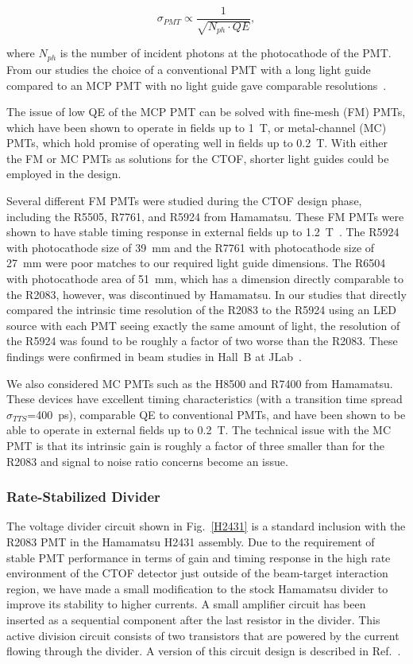 \documentclass{elsart}
\begin{document}
\begin{equation}
\sigma_{PMT} \propto \frac{1}{\sqrt{N_{ph} \cdot QE}},
\end{equation}

\noindent
where $N_{ph}$ is the number of incident photons at the photocathode of the PMT. From our studies
the choice of a conventional PMT with a long light guide compared to an MCP PMT with no light guide
gave comparable resolutions~\cite{baturin06}.

The issue of low QE of the MCP PMT can be solved with fine-mesh (FM) PMTs, which have been
shown to operate in fields up to 1~T, or metal-channel (MC) PMTs, which hold promise of
operating well in fields up to 0.2~T. With either the FM or MC PMTs as solutions for the CTOF,
shorter light guides could be employed in the design.

Several different FM PMTs were studied during the CTOF design phase, including the R5505,
R7761, and R5924 from Hamamatsu. These FM PMTs were shown to have stable timing response
in external fields up to 1.2~T~\cite{bonesini}. The R5924 with photocathode size of 39~mm
and the R7761 with photocathode size of 27~mm were poor matches to our required light guide
dimensions. The R6504 with photocathode area of 51~mm, which has a dimension directly comparable
to the R2083, however, was discontinued by Hamamatsu. In our studies that directly compared
the intrinsic time resolution of the R2083 to the R5924 using an LED source with each PMT
seeing exactly the same amount of light, the resolution of the R5924 was found to be roughly 
a factor of two worse than the R2083. These findings were confirmed in beam studies in
Hall~B at JLab~\cite{baturin11}.

We also considered MC PMTs such as the H8500 and R7400 from Hamamatsu. These devices have
excellent timing characteristics (with a transition time spread $\sigma_{TTS}$=400~ps), 
comparable QE to conventional PMTs, and have been shown to be able to operate in external 
fields up to 0.2~T. The technical issue with the MC PMT is that its intrinsic gain is 
roughly a factor of three smaller than for the R2083 and signal to noise ratio concerns 
become an issue.

\subsubsection{Rate-Stabilized Divider}
\label{divider}

The voltage divider circuit shown in Fig.~\ref{H2431} is a standard inclusion with the
R2083 PMT in the Hamamatsu H2431 assembly. Due to the requirement of stable PMT performance
in terms of gain and timing response in the high rate environment of the CTOF detector
just outside of the beam-target interaction region, we have made a small modification to
the stock Hamamatsu divider to improve its stability to higher currents. A small amplifier 
circuit has been inserted as a sequential component after the last resistor in the divider. 
This active division circuit consists of two transistors that are powered by the current 
flowing through the divider. A version of this circuit design is described in Ref.~\cite{popov}. 
\end{document}
